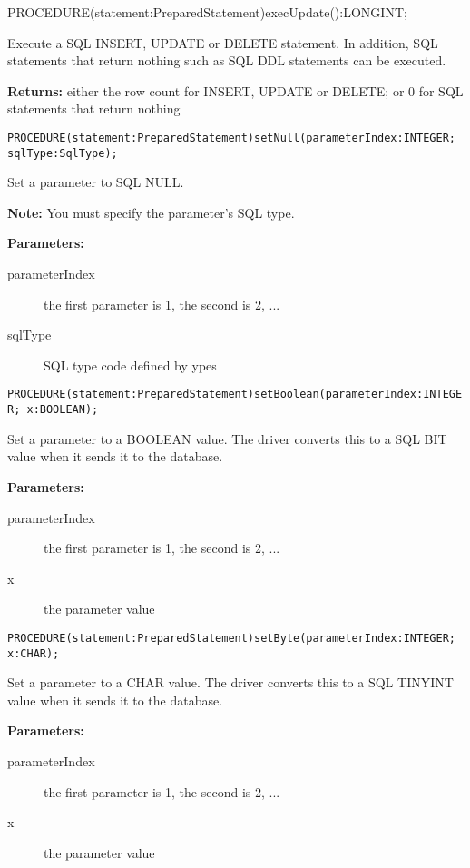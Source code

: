 PROCEDURE(statement:PreparedStatement)execUpdate():LONGINT;

Execute a SQL INSERT, UPDATE or DELETE statement. In addition, SQL statements that return nothing such as SQL DDL statements can be executed. 

{\bf Returns: } 
either the row count for INSERT, UPDATE or DELETE; or 0 for SQL statements that return nothing 



\verb'PROCEDURE(statement:PreparedStatement)setNull(parameterIndex:INTEGER; sqlType:SqlType);'

Set a parameter to SQL NULL. 

{\bf Note: } You must specify the parameter's SQL type. 

{\bf Parameters: }
\begin{description}
\item[parameterIndex] the first parameter is 1, the second is 2, ... 
\item[sqlType] SQL type code defined by ypes 
\end{description}



\verb'PROCEDURE(statement:PreparedStatement)setBoolean(parameterIndex:INTEGER; x:BOOLEAN);'

Set a parameter to a BOOLEAN value. The driver converts this to a SQL BIT value when it sends it to the database. 

{\bf Parameters: }
\begin{description}
\item[parameterIndex] the first parameter is 1, the second is 2, ... 
\item[x] the parameter value 
\end{description}



\verb'PROCEDURE(statement:PreparedStatement)setByte(parameterIndex:INTEGER; x:CHAR);'

Set a parameter to a CHAR value. The driver converts this to a SQL TINYINT value when it sends it to the database. 

{\bf Parameters: }
\begin{description}
\item[parameterIndex] the first parameter is 1, the second is 2, ... 
\item[x] the parameter value 
\end{description}



